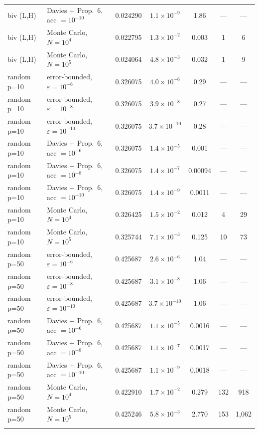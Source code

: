 \begin{table}[t]
\begin{tabular*}{\textwidth}{@{\extracolsep\fill}llccccc@{}}
biv (L,H) & Davies + Prop.~6, acc $=10^{-10}$ & 0.024290 & $1.1\times10^{-9}$ & 1.86 & --- & --- \\
biv (L,H) & Monte Carlo, $N=10^{4}$ & 0.022795 & $1.3\times10^{-2}$ & 0.003 & 1 & 6 \\
biv (L,H) & Monte Carlo, $N=10^{5}$ & 0.024064 & $4.8\times10^{-3}$ & 0.032 & 1 & 9 \\
\midrule
random p=10 & error-bounded, $\varepsilon=10^{-6}$ & 0.326075 & $4.0\times10^{-6}$ & 0.29 & --- & --- \\
random p=10 & error-bounded, $\varepsilon=10^{-8}$ & 0.326075 & $3.9\times10^{-8}$ & 0.27 & --- & --- \\
random p=10 & error-bounded, $\varepsilon=10^{-10}$ & 0.326075 & $3.7\times10^{-10}$ & 0.28 & --- & --- \\
random p=10 & Davies + Prop.~6, acc $=10^{-6}$ & 0.326075 & $1.4\times10^{-5}$ & 0.001 & --- & --- \\
random p=10 & Davies + Prop.~6, acc $=10^{-8}$ & 0.326075 & $1.4\times10^{-7}$ & 0.00094 & --- & --- \\
random p=10 & Davies + Prop.~6, acc $=10^{-10}$ & 0.326075 & $1.4\times10^{-9}$ & 0.0011 & --- & --- \\
random p=10 & Monte Carlo, $N=10^{4}$ & 0.326425 & $1.5\times10^{-2}$ & 0.012 & 4 & 29 \\
random p=10 & Monte Carlo, $N=10^{5}$ & 0.325744 & $7.1\times10^{-3}$ & 0.125 & 10 & 73 \\
\midrule
random p=50 & error-bounded, $\varepsilon=10^{-6}$ & 0.425687 & $2.6\times10^{-6}$ & 1.04 & --- & --- \\
random p=50 & error-bounded, $\varepsilon=10^{-8}$ & 0.425687 & $3.1\times10^{-8}$ & 1.06 & --- & --- \\
random p=50 & error-bounded, $\varepsilon=10^{-10}$ & 0.425687 & $3.7\times10^{-10}$ & 1.06 & --- & --- \\
random p=50 & Davies + Prop.~6, acc $=10^{-6}$ & 0.425687 & $1.1\times10^{-5}$ & 0.0016 & --- & --- \\
random p=50 & Davies + Prop.~6, acc $=10^{-8}$ & 0.425687 & $1.1\times10^{-7}$ & 0.0017 & --- & --- \\
random p=50 & Davies + Prop.~6, acc $=10^{-10}$ & 0.425687 & $1.1\times10^{-9}$ & 0.0018 & --- & --- \\
random p=50 & Monte Carlo, $N=10^{4}$ & 0.422910 & $1.7\times10^{-2}$ & 0.279 & 132 & 918 \\
random p=50 & Monte Carlo, $N=10^{5}$ & 0.425246 & $5.8\times10^{-3}$ & 2.770 & 153 & 1,062 \\
\botrule
\end{tabular*}
\end{table}
